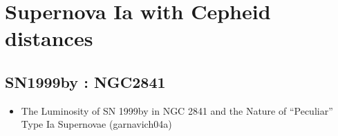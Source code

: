 \section{Supernova Ia with Cepheid distances}
\subsection{SN1999by : NGC2841}
\begin{itemize}
\item  The Luminosity of SN 1999by in NGC 2841 and the Nature of ``Peculiar'' Type Ia Supernovae
(garnavich04a) \citet{garnavich04a} \\
\end{itemize}

